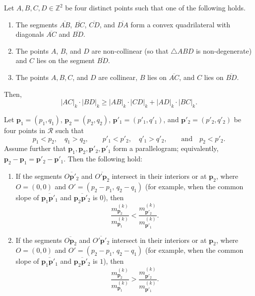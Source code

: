 \documentclass[10pt,a4paper]{amsart}
\begin{document}
\begin{prop}\label{prop:ptolemy}
    Let $A, B, C, D \in \mathbb{Z}^2$ be four distinct points such that one of the following holds.
    \begin{enumerate}
        \item[$(a)$] The segments $\overline{AB}$, $\overline{BC}$, $\overline{CD}$, and $\overline{DA}$ 
        form a convex quadrilateral with diagonals $\overline{AC}$ and $\overline{BD}$.
        
        \item[$(b)$] The points $A$, $B$, and $D$ are non-collinear (so that $\triangle ABD$ is non-degenerate) 
        and $C$ lies on the segment $\overline{BD}$.

        \item[$(c)$] The points $A,B,C$, and $D$ are collinear, $B$ lies on $\overline{AC}$, and $C$ lies on $\overline{BD}$.
    \end{enumerate}
    Then,
    \[
        |AC|_k \cdot |BD|_k \geq |AB|_k \cdot |CD|_k + |AD|_k \cdot |BC|_k.
    \]
\end{prop}

\begin{lemma}\label{lem:ratio_comparison}
Let $\mathbf{p}_1 = (p_1, q_1)$, $\mathbf{p}_2 = (p_2, q_2)$, 
$\mathbf{p}'_1 = (p'_1, q'_1)$, and $\mathbf{p}'_2 = (p'_2, q'_2)$
be four points in $\mathcal{R}$ such that
\[
p_1 < p_2,\quad q_1 > q_2,\qquad 
p'_1 < p'_2,\quad q'_1 > q'_2,\qquad \text{and}\quad p_2 < p'_2.
\]
Assume further that $\mathbf{p}_1, \mathbf{p}_2, \mathbf{p}'_2, \mathbf{p}'_1$ form a parallelogram; equivalently,
$\mathbf{p}_2 - \mathbf{p}_1 = \mathbf{p}'_2 - \mathbf{p}'_1.$
Then the following hold:

\begin{enumerate}
    \item[$(1)$] If the segments $\overline{O\mathbf{p}'_2}$ and $\overline{O'\mathbf{p}_2}$ intersect in their interiors or at $\mathbf p_2$, where $O = (0,0)$ and $O' = (p_2 - p_1,\, q_2 - q_1)$ (for example, when the common slope of $\overline{\mathbf{p}_1\mathbf{p}'_1}$ and $\overline{\mathbf{p}_2\mathbf{p}'_2}$ is $0$), then
    \[
        \frac{m^{(k)}_{\mathbf{p}_2}}{m^{(k)}_{\mathbf{p}_1}} 
        < 
        \frac{m^{(k)}_{\mathbf{p}'_2}}{m^{(k)}_{\mathbf{p}'_1}}.
    \]

    \item[$(2)$]  If the segments $\overline{O\mathbf{p}_2}$ and $\overline{O'\mathbf{p}'_2}$ intersect in their interiors or at $\mathbf p_2$, where $O = (0,0)$ and $O' = (p_2 - p_1,\, q_2 - q_1)$ (for example, when the common slope of $\overline{\mathbf{p}_1\mathbf{p}'_1}$ and $\overline{\mathbf{p}_2\mathbf{p}'_2}$ is $1$), then
    \[
        \frac{m^{(k)}_{\mathbf{p}_2}}{m^{(k)}_{\mathbf{p}_1}} 
        >
        \frac{m^{(k)}_{\mathbf{p}'_2}}{m^{(k)}_{\mathbf{p}'_1}}.
    \]
\end{enumerate}
\end{lemma}
\end{document}
